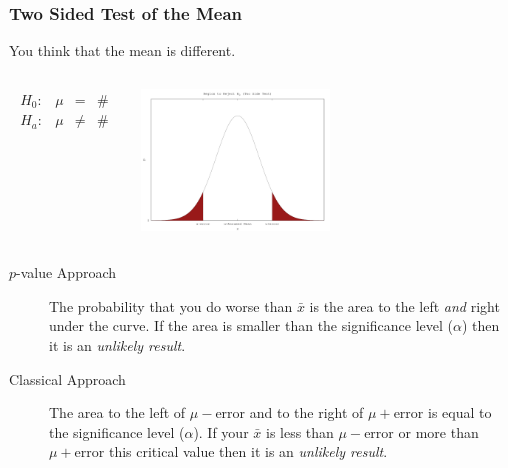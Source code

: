 \begin{frame}
  \frametitle{Two Sided Test of the Mean}

  \vspace*{-1em}

  You think that the mean is different.

  \begin{columns}
    \begin{eqnarray*}
      \begin{array}{lrcl}
        H_0: & \mu & = & \# \\
        H_a: & \mu & \neq & \#
      \end{array}
    \end{eqnarray*}


    \includegraphics[width=5cm]{img/twoSideHypothesisTest}

  \end{columns}

  \begin{description}
  \item[$p$-value Approach] The probability that you do worse than
    $\bar{x}$ is the area to the left \textit{and} right under the
    curve. If the area is smaller than the significance level
    ($\alpha$) then it is an \textit{unlikely result}.
  \item[Classical Approach] The area to the left of
    $\mu-\mathrm{error}$ and to the right of $\mu+\mathrm{error}$ is
    equal to the significance level ($\alpha$). If your $\bar{x}$ is
    less than $\mu-\mathrm{error}$ or more than $\mu+\mathrm{error}$
    this critical value then it is an \textit{unlikely result}.
  \end{description}


\end{frame}



